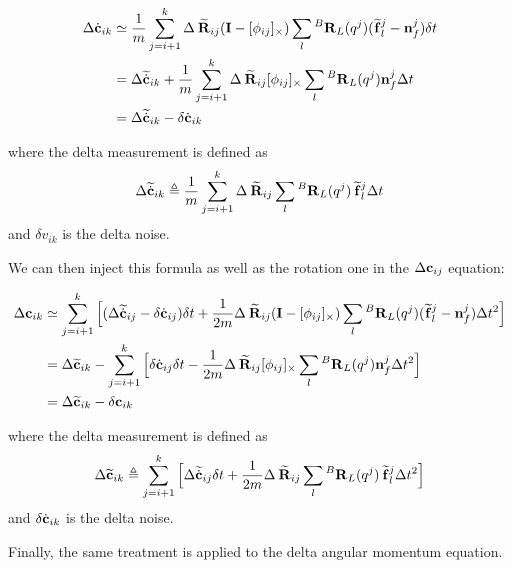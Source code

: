 \documentclass[11pt]{article}
\newcommand{\Rot}[2]{\prescript{#1}{}{\bfR}_{#2}}
\newcommand{\Rotm}[2]{\prescript{#1}{}{\widetilde{\bfR}}_{#2}}
\newcommand{\noise}{\bfn}
\newcommand{\forcem}[2]{\prescript{#1}{}{\widetilde{\bff}}_{#2}}
\newcommand{\COM}{\bfc}
\newcommand{\COMm}{\widetilde{\bfc}}
\newcommand{\COMd}{\dot{\bfc}}
\newcommand{\COMdm}{\widetilde{\dot{\bfc}}}
\newcommand{\Ident}{\bfI}
\begin{document}
\begin{equation}
\begin{split}
\Delta \COMd_{ik} &\simeq
\frac{1}{m} \sum_{j=i+1}^{k} \Delta \Rotm{}{ij}(\Ident - [\phi_{ij}]_{\times}) \sum_l \Rot{B}{L}(q^{j}) (\forcem{}{l}^{j} - \noise_f^{j}) \delta t 
\\
&= \Delta \COMdm_{ik} + \frac{1}{m} \sum_{j=i+1}^{k} \Delta \Rotm{}{ij}[\phi_{ij}]_{\times} \sum_l \Rot{B}{L}(q^{j})\noise_f^{j} \Delta t
\\
&= \Delta \COMdm_{ik} - \delta \COMd_{ik}
\end{split}
\end{equation}

where the delta measurement is defined as
\begin{equation}
    \Delta \COMdm_{ik} \triangleq \frac{1}{m} \sum_{j=i+1}^{k} \Delta \Rotm{}{ij} \sum_l \Rot{B}{L}(q^{j}) \forcem{}{l}^{j}\Delta t
\end{equation}
 and $\delta v_{ik}$ is the delta noise.

We can then inject this formula as well as the rotation one in the $\Delta \COM_{ij}$ equation:

\begin{equation}
\begin{split}
\Delta \COM_{ik} &\simeq
\sum_{j=i+1}^{k} \Big[ (\Delta \COMdm_{ij} - \delta \COMd_{ij}) \delta t + \frac{1}{2m} \Delta \Rotm{}{ij}(\Ident - [\phi_{ij}]_{\times}) \sum_l \Rot{B}{L}(q^{j}) (\forcem{}{l}^{j} - \noise_f^{j}) \Delta t^2 \Big]
\\
&= \Delta \COMm_{ik} - \sum_{j=i+1}^{k} \Big[ \delta \COMd_{ij} \delta t - \frac{1}{2m} \Delta \Rotm{}{ij}[\phi_{ij}]_{\times} \sum_l \Rot{B}{L}(q^{j}) \noise_f^{j} \Delta t^2 \Big]
\\
&= \Delta \COMm_{ik} - \delta \COM_{ik}
\end{split}
\end{equation}

where the delta measurement is defined as
\begin{equation}
    \Delta \COMm_{ik} \triangleq 
    \sum_{j=i+1}^{k} \Big[\Delta \COMdm_{ij} \delta t + \frac{1}{2m} \Delta \Rotm{}{ij} \sum_l \Rot{B}{L}(q^{j}) \forcem{}{l}^{j} \Delta t^2 \Big]
\end{equation}
 and $\delta \COMd_{ik}$ is the delta noise.

Finally, the same treatment is applied to the delta angular momentum equation.
\end{document}
